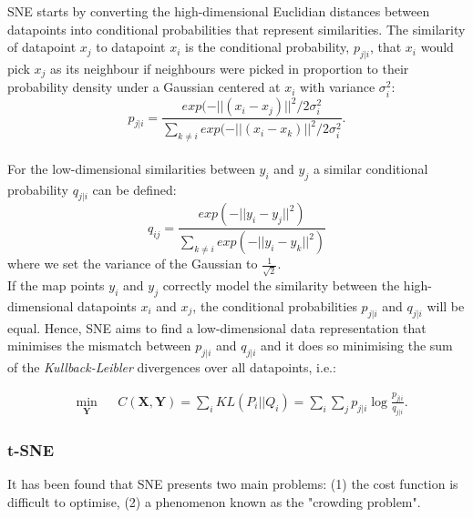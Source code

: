 \documentclass[11pt]{article}
\begin{document}
SNE starts by converting the high-dimensional Euclidian distances between datapoints into conditional probabilities that represent similarities. The similarity of datapoint $x_j$ to datapoint $x_i$ is the conditional probability, $p_{j|i}$, that $x_i$ would pick $x_j$ as its neighbour if neighbours were picked in proportion to their probability density under a Gaussian centered at $x_i$ with variance $\sigma_i^2$:
\begin{equation}
p_{j|i}=\frac{exp ( - ||(x_i - x_j) ||^2 / 2\sigma_i ^2 }{\sum_{k \neq i} exp(-|| (x_i - x_k )||^2 / 2\sigma_i ^2 }.
\end{equation}
\\

For the low-dimensional similarities between $y_i$ and $y_j$ a similar conditional probability $q_{j|i}$ can be defined:
\begin{equation}
q_{ij}=\frac{exp(-|| y_i -  y_j ||^2)}{\sum_{k \neq i} exp(-|| y_i - y_k ||^2 )}
\end{equation}
where we set the variance of the Gaussian to $\frac{1}{\sqrt2}$.
\\

If the map points  $y_i$ and $y_j$ correctly model the similarity between the high-dimensional datapoints $x_i$ and $x_j$, the conditional probabilities $p_{j|i}$ and $q_{j|i}$ will be equal. Hence, SNE aims to find a low-dimensional data representation that minimises the mismatch between $p_{j|i}$ and $q_{j|i}$ and it does so minimising the sum of the \emph{Kullback-Leibler} divergences over all datapoints, i.e.:

\begin{equation}
\begin{aligned}
& \underset{\mathbf{Y}}{\text{min}}
&& C(\mathbf{X},\mathbf{Y})={\displaystyle \sum_i KL(P_i||Q_i)=\sum _i \sum_j p_{j|i}\log {\frac {p_{j|i}}{q_{j|i}}}}.
\end{aligned}
\end{equation}

\subsubsection{t-SNE}
It has been found that SNE presents two main problems: (1) the cost function is difficult to optimise, (2) a phenomenon known as the "crowding problem".
\\
\end{document}
